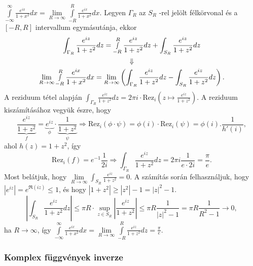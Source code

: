 \documentclass[12pt,a4paper]{scrartcl}
\begin{document}
\({\int\limits_{- \infty}^{\infty}{\frac{e^{ix}}{1 + x^{2}}dx}} = \lim\limits_{R\rightarrow\infty}{\int\limits_{- R}^{R}{\frac{e^{ix}}{1 + x^{2}}dx}}\).
Legyen \(\Gamma_{R}\) az \(S_{R}\) -rel jelölt félkörvonal és a
\(\left\lbrack {- R,R} \right\rbrack\) intervallum egymásutánja, ekkor
\[\begin{gathered}
  \int_{{\Gamma _R}} {\frac{{{e^{iz}}}}{{1 + {z^2}}}dz}  = \mathop \smallint \limits_{ - R}^R \frac{{{e^{iz}}}}{{1 + {z^2}}}dz + \int_{{S_R}} {\frac{{{e^{iz}}}}{{1 + {z^2}}}dz}  \\ 
   \Downarrow  \\ 
  \mathop {\lim }\limits_{R \to \infty } \mathop \smallint \limits_{ - R}^R \frac{{{e^{ix}}}}{{1 + {x^2}}}dx = \mathop {\lim }\limits_{R \to \infty } \left( {\int_{{\Gamma _R}} {\frac{{{e^{iz}}}}{{1 + {z^2}}}dz}  - \int_{{S_R}} {\frac{{{e^{iz}}}}{{1 + {z^2}}}dz} } \right). \\ 
\end{gathered} \] A reziduum tétel alapján
\({\int_{\Gamma_{R}}{\frac{e^{iz}}{1 + z^{2}}dz}} = 2\pi i \cdot \text{Rez}_{i}\left( z\mapsto\frac{e^{iz}}{1 + z^{2}} \right)\).
A reziduum kiszámításához vegyük észre, hogy
\[\underbrace {\frac{{{e^{iz}}}}{{1 + {z^2}}}}_f = \underbrace {{e^{iz}}}_\phi  \cdot \underbrace {\frac{1}{{1 + {z^2}}}}_\psi  \Rightarrow {\text{Rez}}_i\left( {\phi  \cdot \psi } \right) = \phi \left( i \right) \cdot {{\text{Rez}}_i}\left( \psi  \right) = \phi \left( i \right).\frac{1}{{h'\left( i \right)}},\]
ahol \(h\left( z \right) = 1 + z^{2}\), így
\[{{\text{Rez}}_i}\left( f \right) = {e^{ - 1}}\frac{1}{{2i}} \Rightarrow \int_{{\Gamma _R}} {\frac{{{e^{iz}}}}{{1 + {z^2}}}dz}  = 2\pi i\frac{1}{{e \cdot 2i}} = \frac{\pi }{e}.\]
Most belátjuk, hogy
\(\lim\limits_{R\rightarrow\infty}{\int_{S_{R}}\frac{e^{iz}}{1 + z^{2}}} = 0\).
A számítás során felhasználjuk, hogy
\(\left| e^{iz} \right| = e^{\Re{({iz})}} \leq 1\), és hogy
\(\left| {1 + z^{2}} \right| \geq \left| z^{2} \right| - 1 = \left| z \right|^{2} - 1\).
\[\left. \left| {\int_{S_{R}}{\frac{e^{iz}}{1 + z^{2}}dz}} \right| \leq \pi R \cdot \sup\limits_{z \in S_{R}}\left| \frac{e^{iz}}{1 + z^{2}} \right| \leq \pi R\frac{1}{\left| z \right|^{2} - 1} = \pi R\frac{1}{R^{2} - 1}\rightarrow 0, \right.\]
ha \(\left. R\rightarrow\infty \right.\), így
\({\int\limits_{- \infty}^{\infty}{\frac{e^{ix}}{1 + x^{2}}dx}} = \lim\limits_{R\rightarrow\infty}{\int\limits_{- R}^{R}{\frac{e^{iz}}{1 + z^{2}}dz}} = \frac{\pi}{e}\).

\hypertarget{komplex-fuggvenyek-inverze}{%
\subsubsection{Komplex függvények
inverze}\label{komplex-fuggvenyek-inverze}}
\end{document}
